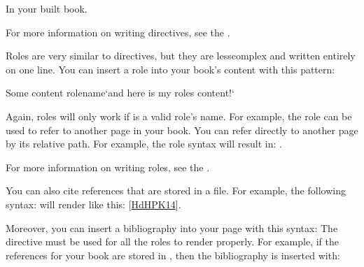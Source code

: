 \documentclass[letterpaper,10pt,english]{jupyterBook}
\begin{document}
\sphinxAtStartPar
In your built book.

\sphinxAtStartPar
For more information on writing directives, see the
.

\begin{DUlineblock}{0em}
\item[] 
\end{DUlineblock}

\sphinxAtStartPar
Roles are very similar to directives, but they are less\sphinxhyphen{}complex and written
entirely on one line. You can insert a role into your book’s content with
this pattern:

\begin{sphinxVerbatim}[commandchars=\\\{\}]
Some content \PYGZob{}rolename\PYGZcb{}`and here is my role\PYGZsq{}s content!`
\end{sphinxVerbatim}

\sphinxAtStartPar
Again, roles will only work if  is a valid role’s name. For example,
the  role can be used to refer to another page in your book. You can
refer directly to another page by its relative path. For example, the
role syntax  will result in: {\hyperref[\detokenize{00_Intro/intro::doc}]{}}.

\sphinxAtStartPar
For more information on writing roles, see the
.

\begin{DUlineblock}{0em}
\item[] 
\end{DUlineblock}

\sphinxAtStartPar
You can also cite references that are stored in a  file. For example,
the following syntax:  will render like
this: {[}\hyperlink{cite.00_Intro/intro:id3}{HdHPK14}{]}.

\sphinxAtStartPar
Moreover, you can insert a bibliography into your page with this syntax:
The  directive must be used for all the  roles to
render properly.
For example, if the references for your book are stored in ,
then the bibliography is inserted with:
\end{document}
